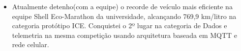 
\begin{itemize}[leftmargin=1em, itemsep=-0.1em, topsep=-0.1em]
  \item {}
        {Atualmente detenho(com a equipe) o recorde de veículo mais eficiente na equipe Shell Eco-Marathon da universidade, alcançando
          769,9 km/litro na categoria protótipo ICE. Conquistei o 2º lugar na categoria de Dados e telemetria na mesma
          competição usando arquitetura baseada em MQTT e rede celular.}
\end{itemize}
